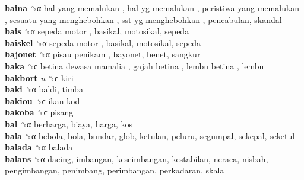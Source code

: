 \textbf{baina} ␝α   hal yang memalukan ,  hal yg memalukan ,  peristiwa yang memalukan ,  sesuatu yang menghebohkan ,  sst yg menghebohkan , pencabulan, skandal  \\
\textbf{bais} ␝α   sepeda motor , basikal, motosikal, sepeda  \\
\textbf{baiskel} ␝α   sepeda motor , basikal, motosikal, sepeda  \\
\textbf{bajonet} ␝α   pisau penikam , bayonet, benet, sangkur  \\
\textbf{baka} ␝ϲ   betina dewasa mamalia ,  gajah betina ,  lembu betina , lembu  \\
\textbf{bakbort} \emph{n}  ␝ϲ  kiri  \\
\textbf{baki} ␝α  baldi, timba  \\
\textbf{bakiou} ␝ϲ   ikan kod   \\
\textbf{bakoba} ␝ϲ  pisang  \\
\textbf{bal} ␝α  berharga, biaya, harga, kos  \\
\textbf{bala} ␝α  bebola, bola, bundar, glob, ketulan, peluru, segumpal, sekepal, seketul  \\
\textbf{balada} ␝α  balada  \\
\textbf{balans} ␝α  dacing, imbangan, keseimbangan, kestabilan, neraca, nisbah, pengimbangan, penimbang, perimbangan, perkadaran, skala  \\
